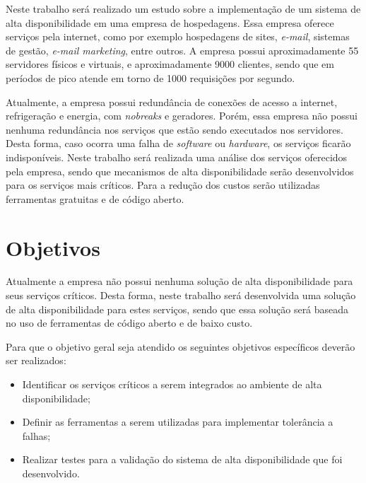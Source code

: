 Neste trabalho será realizado um estudo sobre a implementação de um sistema de alta disponibilidade em uma empresa de hospedagens. 
Essa empresa oferece serviços pela internet, como por exemplo hospedagens de sites, \textit{e-mail}, sistemas de gestão, \textit{e-mail marketing}, 
entre outros. A empresa possui aproximadamente 55 servidores físicos e virtuais, e aproximadamente 9000 clientes, 
sendo que em períodos de pico atende em torno de 1000 requisições por segundo. 

Atualmente, a empresa possui redundância de conexões de acesso a internet, refrigeração e energia, com \textit{nobreaks} e geradores. 
Porém, essa empresa não possui nenhuma redundância nos serviços que estão sendo executados nos servidores. Desta forma, 
caso ocorra uma falha de \textit{software} ou \textit{hardware}, os serviços ficarão indisponíveis. Neste trabalho será realizada uma análise dos serviços 
oferecidos pela empresa, sendo que mecanismos de alta disponibilidade serão desenvolvidos para os serviços mais críticos. 
Para a redução dos custos serão utilizadas ferramentas gratuitas e de código aberto.

\section{Objetivos}
Atualmente a empresa não possui nenhuma solução de alta disponibilidade para seus serviços críticos. 
Desta forma, neste trabalho será desenvolvida uma solução de alta disponibilidade para estes serviços, 
sendo que essa solução será baseada no uso de ferramentas de código aberto e de baixo custo.

Para que o objetivo geral seja atendido os seguintes objetivos específicos deverão ser realizados:

\begin{itemize}
\item Identificar os serviços críticos a serem integrados ao ambiente de alta disponibilidade;
\item Definir as ferramentas a serem utilizadas para implementar tolerância a falhas;
\item Realizar testes para a validação do sistema de alta disponibilidade que foi desenvolvido.
\end{itemize}

